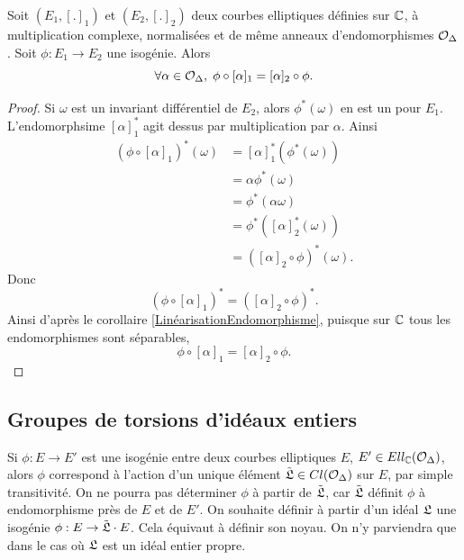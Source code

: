 \begin{Prop}
	Soit $(E_1,[.]_1)$ et $(E_2,[.]_2)$ deux courbes elliptiques définies sur $\mathbb{C}$, à multiplication complexe, normalisées et de même anneaux d'endomorphismes $\mathcal{O}_{\Delta}$. Soit $\phi : E_1 \rightarrow E_2$ une isogénie. Alors 
	\begin{equation*}
		\forall\alpha\in\mathcal{O}_{\Delta},\;\phi\circ[\alpha]_1 = [\alpha]_2\circ\phi.
	\end{equation*}
\end{Prop}

\begin{proof}
	Si $\omega$ est un invariant différentiel de $E_2$, alors $\phi^{*}(\omega)$ en est un pour $E_1$. L'endomorphsime $[\alpha]_{1}^{*}$ agit dessus par multiplication par $\alpha$. Ainsi
	\begin{align*}
		(\phi\circ[\alpha]_1)^{*}(\omega) &= [\alpha]_{1}^{*}(\phi^{*}(\omega))\\
		&= \alpha\phi^{*}(\omega)\\
		&= \phi^{*}(\alpha\omega)\\
		&= \phi^{*}([\alpha]_{2}^{*}(\omega))\\
		&= ([\alpha]_2\circ\phi)^{*}(\omega).
	\end{align*}
	Donc 
	\begin{equation*}
		(\phi\circ[\alpha]_1)^{*} = ([\alpha]_2\circ\phi)^{*}.
	\end{equation*}
	Ainsi d'après le corollaire \ref{LinéarisationEndomorphisme}, puisque sur $\mathbb{C}$ tous les endomorphismes sont séparables, 
	\begin{equation*}
		\phi\circ[\alpha]_1 = [\alpha]_2\circ\phi.
	\end{equation*}
\end{proof}






\subsection{Groupes de torsions d'idéaux entiers}
\label{SECTIONtorsion}

Si $\phi : E \rightarrow E'$ est une isogénie entre deux courbes elliptiques $E$, $E'\in Ell_{\mathbb{C}}(\mathcal{O}_{\Delta})$, alors $\phi$ correspond à l'action d'un unique élément $\tilde{\mathfrak{L}}\in Cl(\mathcal{O}_{\Delta})$ sur $E$, par simple transitivité. On ne pourra pas déterminer $\phi$ à partir de $\tilde{\mathfrak{L}}$, car $\tilde{\mathfrak{L}}$ définit $\phi$ à endomorphisme près de $E$ et de $E'$. On souhaite définir à partir d'un idéal $\mathfrak{L}$ une isogénie $\phi : E\rightarrow \tilde{\mathfrak{L}}\cdot E$. Cela équivaut à définir son noyau. On n'y parviendra que dans le cas où $\mathfrak{L}$ est un idéal entier propre. 

